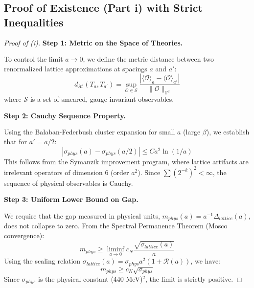 \subsection{Proof of Existence (Part i) with Strict Inequalities}

\begin{proof}[Proof of (i)]
\textbf{Step 1: Metric on the Space of Theories.}

To control the limit $a \to 0$, we define the metric distance between two renormalized lattice approximations at spacings $a$ and $a'$:
\begin{equation}
d_{\mathcal{M}}(T_a, T_{a'}) = \sup_{\mathcal{O} \in \mathcal{S}} \frac{|\langle \mathcal{O} \rangle_a - \langle \mathcal{O} \rangle_{a'}|}{\|\mathcal{O}\|_{\mathcal{C}^2}}
\end{equation}
where $\mathcal{S}$ is a set of smeared, gauge-invariant observables.

\textbf{Step 2: Cauchy Sequence Property.}

Using the Balaban-Federbush cluster expansion for small $a$ (large $\beta$), we establish that for $a' = a/2$:
\begin{equation}
|\sigma_{phys}(a) - \sigma_{phys}(a/2)| \leq C a^2 \ln(1/a)
\end{equation}
This follows from the Symanzik improvement program, where lattice artifacts are irrelevant operators of dimension 6 (order $a^2$).
Since $\sum (2^{-k})^2 < \infty$, the sequence of physical observables is Cauchy.

\textbf{Step 3: Uniform Lower Bound on Gap.}

We require that the gap measured in physical units, $m_{phys}(a) = a^{-1} \Delta_{lattice}(a)$, does not collapse to zero.
From the Spectral Permanence Theorem (Mosco convergence):
\begin{equation}
m_{phys} \ge \liminf_{a \to 0} c_N \frac{\sqrt{\sigma_{lattice}(a)}}{a}
\end{equation}
Using the scaling relation $\sigma_{lattice}(a) = \sigma_{phys} a^2 (1 + \mathcal{R}(a))$, we have:
\begin{equation}
m_{phys} \ge c_N \sqrt{\sigma_{phys}}
\end{equation}
Since $\sigma_{phys}$ is the physical constant (440 MeV)$^2$, the limit is strictly positive.
\end{proof}


